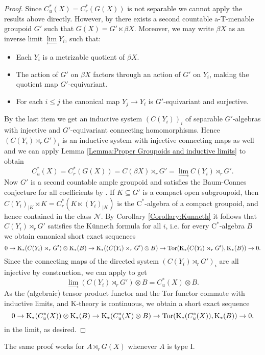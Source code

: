 	\begin{proof}
		Since $C_u^*(X)=C_r^*(G(X))$ is not separable we cannot apply the results above directly. However, by \cite[Theorem~5.4]{STY02} there exists a second countable a-T-menable groupoid $G'$ such that $G(X)=G'\ltimes \beta X$. Moreover, we may write $\beta X$ as an inverse limit $\lim\limits_{\longleftarrow} Y_i$, such that:
		\begin{itemize}
			\item Each $Y_i$ is a metrizable quotient of $\beta X$.
			\item The action of $G'$ on $\beta X$ factors through an action of $G'$ on $Y_i$, making the quotient map $G'$-equivariant.
			\item For each $i\leq j$ the canonical map $Y_j\rightarrow Y_i$ is $G'$-equivariant and surjective.
		\end{itemize}
		By the last item we get an inductive system $(C(Y_i))_i$ of separable $G'$-algebras with injective and $G'$-equivariant connecting homomorphisms. Hence $(C(Y_i)\rtimes_r G')_i$ is an inductive system with injective connecting maps as well and we can apply Lemma \ref{Lemma:Proper Groupoids and inductive limits} to obtain
		$$C_u^*(X)=C_r^*(G(X))=C(\beta X)\rtimes_r G'=\lim\limits_{\longrightarrow} C(Y_i)\rtimes_r G'.$$
		Now $G'$ is a second countable ample groupoid and satisfies the Baum-Connes conjecture for all coefficients by \cite{Tu98}. If $K\subseteq G'$ is a compact open subgroupoid, then $C(Y_i)_{\mid K}\rtimes K=C_r^*(K\ltimes(Y_i)_{\mid K})$ is the $\mathrm{C}^*$-algebra of a compact groupoid, and hence contained in the class $\mathcal{N}$. By Corollary \ref{Corollary:Kunneth} it follows that $C(Y_i)\rtimes_r G'$ satisfies the Künneth formula for all $i$, i.e. for every $\mathrm{C}^*$-algebra $B$ we obtain canonical short exact sequences
		$$0\rightarrow \mathrm K_*(C(Y_i)\rtimes_r G')\otimes \mathrm K_*(B)\rightarrow \mathrm K_*((C(Y_i)\rtimes_r G')\otimes B)\rightarrow \mathrm{Tor}(\mathrm K_*(C(Y_i)\rtimes_r G'),\mathrm K_*(B))\rightarrow 0.$$
		Since the connecting maps of the directed system $(C(Y_i)\rtimes_r G')_i$ are all injective by construction, we can apply \cite[II.9.6.6]{MR2188261} to get $$\lim\limits_{\longrightarrow}(C(Y_i)\rtimes_r G')\otimes B=C_u^*(X)\otimes B.$$
		As the (algebraic) tensor product functor and the Tor functor commute with inductive limits, and $\mathrm{K}$-theory is continuous, we obtain a short exact sequence
		$$0\rightarrow \mathrm K_*(C_u^*(X))\otimes \mathrm K_*(B)\rightarrow \mathrm K_*(C_u^*(X)\otimes B)\rightarrow \mathrm{Tor}(\mathrm K_*(C_u^*(X)),\mathrm K_*(B))\rightarrow 0,$$
		in the limit, as desired.
	\end{proof}
	The same proof works for $A\rtimes_r G(X)$ whenever $A$ is type I.